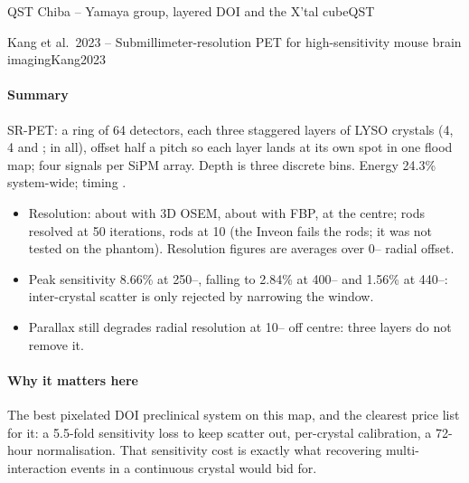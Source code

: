 \begin{programnote}{QST Chiba -- Yamaya group, layered DOI and the X'tal cube}{QST}
\begin{papernote}{Kang et al.\ 2023 -- Submillimeter-resolution PET for high-sensitivity mouse brain imaging}{Kang2023}
\paragraph{Summary}
SR-PET: a  ring of 64 detectors, each three staggered layers of
 LYSO crystals (4, 4 and ;  in all),
offset half a pitch so each layer lands at its own spot in one flood map; four
signals per SiPM array. Depth is three discrete bins. Energy 24.3\% system-wide;
timing .
\begin{itemize}
	\item Resolution: about  with 3D OSEM, about  with FBP,
		at the centre;  rods resolved at 50 iterations, 
		rods at 10 (the Inveon fails the  rods; it was not tested
		on the  phantom). Resolution figures are averages over
		0-- radial offset.
	\item Peak sensitivity 8.66\% at 250--, falling to 2.84\% at
		400-- and 1.56\% at 440--: inter-crystal scatter is
		only rejected by narrowing the window.
	\item Parallax still degrades radial resolution at 10-- off centre:
		three layers do not remove it.
\end{itemize}

\paragraph{Why it matters here}
The best pixelated DOI preclinical system on this map, and the clearest price
list for it: a 5.5-fold sensitivity loss to keep scatter out, per-crystal
calibration, a 72-hour normalisation. That sensitivity cost is exactly what
recovering multi-interaction events in a continuous crystal would bid for.

\end{papernote}

\end{programnote}

